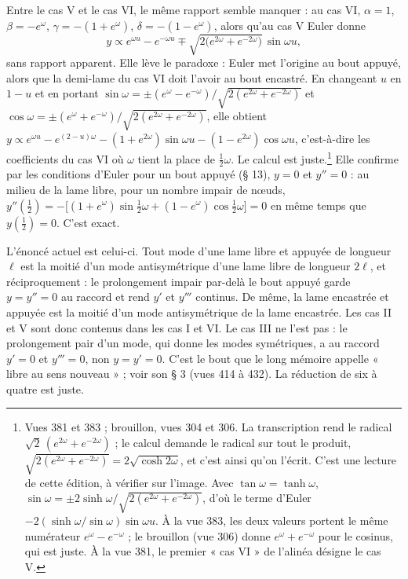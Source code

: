 \documentclass[11pt,a4paper]{article}
\begin{document}
Entre le cas V et le cas VI, le même rapport semble manquer : au cas VI, $\alpha=1$, $\beta=-e^{\omega}$, $\gamma=-(1+e^{\omega})$, $\delta=-(1-e^{\omega})$, alors qu'au cas V Euler donne
\[
y\propto e^{\omega u}-e^{-\omega u}\mp\sqrt{2\bigl(e^{2\omega}+e^{-2\omega}\bigr)}\,\sin\omega u ,
\]
sans rapport apparent. Elle lève le paradoxe : Euler met l'origine au bout appuyé, alors que la demi-lame du cas VI doit l'avoir au bout encastré. En changeant $u$ en $1-u$ et en portant $\sin\omega=\pm(e^{\omega}-e^{-\omega})/\sqrt{2(e^{2\omega}+e^{-2\omega})}$ et $\cos\omega=\pm(e^{\omega}+e^{-\omega})/\sqrt{2(e^{2\omega}+e^{-2\omega})}$, elle obtient $y\propto e^{\omega u}-e^{(2-u)\omega}-(1+e^{2\omega})\sin\omega u-(1-e^{2\omega})\cos\omega u$, c'est-à-dire les coefficients du cas VI où $\omega$ tient la place de $\frac12\omega$. Le calcul est juste.\footnote{Vues 381 et 383 ; brouillon, vues 304 et 306. La transcription rend le radical $\sqrt{2}\,(e^{2\omega}+e^{-2\omega})$ ; le calcul demande le radical sur tout le produit, $\sqrt{2(e^{2\omega}+e^{-2\omega})}=2\sqrt{\cosh2\omega}$, et c'est ainsi qu'on l'écrit. C'est une lecture de cette édition, à vérifier sur l'image. Avec $\tan\omega=\tanh\omega$, $\sin\omega=\pm2\sinh\omega/\sqrt{2(e^{2\omega}+e^{-2\omega})}$, d'où le terme d'Euler $-2(\sinh\omega/\sin\omega)\sin\omega u$. À la vue 383, les deux valeurs portent le même numérateur $e^{\omega}-e^{-\omega}$ ; le brouillon (vue 306) donne $e^{\omega}+e^{-\omega}$ pour le cosinus, qui est juste. À la vue 381, le premier « cas VI » de l'alinéa désigne le cas V.} Elle confirme par les conditions d'Euler pour un bout appuyé (§ 13), $y=0$ et $y''=0$ : au milieu de la lame libre, pour un nombre impair de nœuds, $y''(\frac12)=-\bigl[(1+e^{\omega})\sin\frac12\omega+(1-e^{\omega})\cos\frac12\omega\bigr]=0$ en même temps que $y(\frac12)=0$. C'est exact.

L'énoncé actuel est celui-ci. Tout mode d'une lame libre et appuyée de longueur $\ell$ est la moitié d'un mode antisymétrique d'une lame libre de longueur $2\ell$, et réciproquement : le prolongement impair par-delà le bout appuyé garde $y=y''=0$ au raccord et rend $y'$ et $y'''$ continus. De même, la lame encastrée et appuyée est la moitié d'un mode antisymétrique de la lame encastrée. Les cas II et V sont donc contenus dans les cas I et VI. Le cas III ne l'est pas : le prolongement pair d'un mode, qui donne les modes symétriques, a au raccord $y'=0$ et $y'''=0$, non $y=y'=0$. C'est le bout que le long mémoire appelle « libre au sens nouveau » ; voir son § 3 (vues 414 à 432). La réduction de six à quatre est juste.
\end{document}
